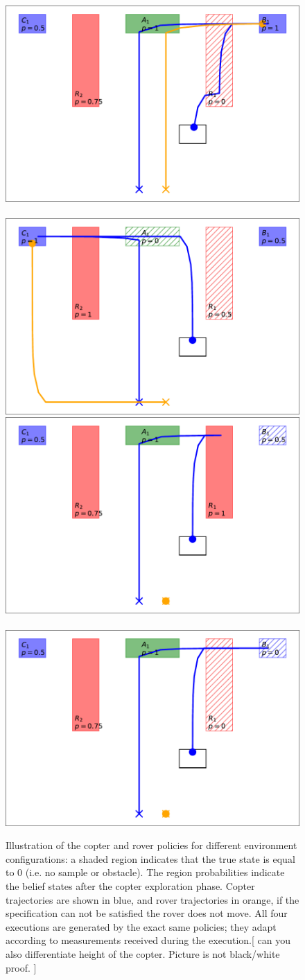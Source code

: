 \documentclass[conference]{IEEEtran}
\newcommand{\sofie}[1]{{\color{orange}[ #1 ]}}
\begin{document}
\begin{figure}
	\begin{center}
	\includegraphics[width=0.4\columnwidth]{2figs/exp0-map.pdf} ~ 
	\includegraphics[width=0.4\columnwidth]{2figs/exp1-map.pdf} \\
	\vspace{1mm} 
	\includegraphics[width=0.4\columnwidth]{2figs/exp2-map.pdf} ~ 
	\includegraphics[width=0.4\columnwidth]{2figs/exp3-map.pdf}
	\end{center}
	\caption{Illustration of the copter and rover policies for different environment configurations: a shaded region indicates that the true state is equal to 0 (i.e. no sample or obstacle). The region probabilities indicate the belief states after the copter exploration phase. Copter trajectories are shown in blue, and rover trajectories in orange, if the specification can not be satisfied the rover does not move. All four executions are generated by the exact same policies; they adapt according to measurements received during the execution.\sofie{can you also differentiate height of the copter. Picture is not black/white proof. } }
	\label{fig:copter_executions}
\end{figure}
\end{document}
